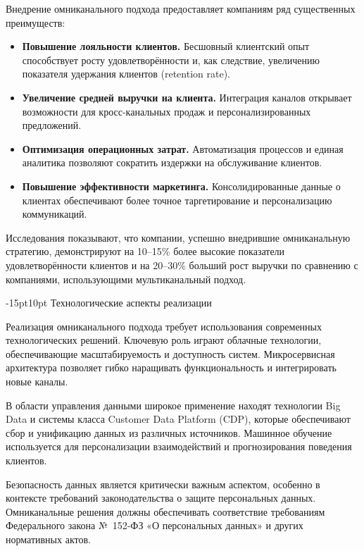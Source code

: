 \documentclass[12pt,a4paper]{report}
\makeatletter
\renewcommand{\section}{%
  \@startsection{section}{1}{\z@}%
  {-15pt}{10pt}%
  {\centering\normalfont\bfseries\large}}
\makeatother
\begin{document}
Внедрение омниканального подхода предоставляет компаниям ряд существенных преимуществ:

\begin{itemize}
    \item \textbf{Повышение лояльности клиентов.} Бесшовный клиентский опыт способствует росту удовлетворённости и, как следствие, увеличению показателя удержания клиентов (retention rate).

    \item \textbf{Увеличение средней выручки на клиента.} Интеграция каналов открывает возможности для кросс-канальных продаж и персонализированных предложений.

    \item \textbf{Оптимизация операционных затрат.} Автоматизация процессов и единая аналитика позволяют сократить издержки на обслуживание клиентов.

    \item \textbf{Повышение эффективности маркетинга.} Консолидированные данные о клиентах обеспечивают более точное таргетирование и персонализацию коммуникаций.
\end{itemize}

Исследования показывают, что компании, успешно внедрившие омниканальную стратегию, демонстрируют на 10--15\% более высокие показатели удовлетворённости клиентов и на 20--30\% больший рост выручки по сравнению с компаниями, использующими мультиканальный подход.

\section{Технологические аспекты реализации}

Реализация омниканального подхода требует использования современных технологических решений. Ключевую роль играют облачные технологии, обеспечивающие масштабируемость и доступность систем. Микросервисная архитектура позволяет гибко наращивать функциональность и интегрировать новые каналы.

В области управления данными широкое применение находят технологии Big Data и системы класса Customer Data Platform (CDP), которые обеспечивают сбор и унификацию данных из различных источников. Машинное обучение используется для персонализации взаимодействий и прогнозирования поведения клиентов.

Безопасность данных является критически важным аспектом, особенно в контексте требований законодательства о защите персональных данных. Омниканальные решения должны обеспечивать соответствие требованиям Федерального закона №~152-ФЗ «О персональных данных» и других нормативных актов.
\end{document}
